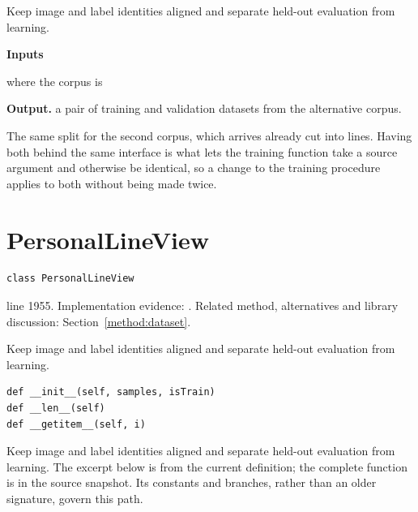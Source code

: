 Keep image and label identities aligned and separate held-out evaluation from learning.




\noindent\textbf{Inputs}
\begin{description}[leftmargin=2.2em,style=nextline,font=\normalfont\ttfamily]\setlength\itemsep{1pt}
  \item[{dataDir}] \normalfont where the corpus is
\end{description}

\noindent\textbf{Output.} a pair of training and validation datasets from the alternative corpus.


The same split for the second corpus, which arrives already cut into lines. Having both behind the same interface is what lets the training function take a source argument and otherwise be identical, so a change to the training procedure applies to both without being made twice.



\section{PersonalLineView}\label{fn:train:PersonalLineView}
\begin{lstlisting}[style=sig]
class PersonalLineView
\end{lstlisting}
 line 1955. Implementation evidence: \cite{code2026}. Related method, alternatives and library discussion: Section~\ref{method:dataset}.


Keep image and label identities aligned and separate held-out evaluation from learning.


\begin{lstlisting}[style=plain]
def __init__(self, samples, isTrain)
def __len__(self)
def __getitem__(self, i)
\end{lstlisting}
Keep image and label identities aligned and separate held-out evaluation from learning. The excerpt below is from the current definition; the complete function is in the source snapshot. Its constants and branches, rather than an older signature, govern this path.


